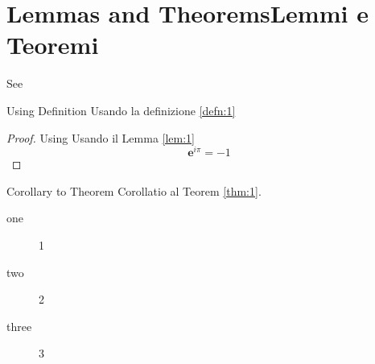 \section[L and T]{\ifCDLeng Lemmas and Theorems\fi\ifCDLita Lemmi e Teoremi\fi}

\begin{Lem}[Cauchy]\label{lem:1}
  \lipsum[3]

  See \cite{wiki:it:tautol}
\end{Lem}

\begin{Theorem}\label{thm:1}
  \CDLeng Using Definition
  \CDLita Usando la definizione
  \ref{defn:1} \\
  \lipsum[4]
  \begin{proof}
    \CDLeng Using 
    \CDLita Usando il Lemma \ref{lem:1}
    \begin{equation}
      \label{eq:1}
      {\mathbf{e}}^{i \pi }=-1
    \end{equation}
  \end{proof}
\end{Theorem}


\begin{Cor}\label{cor:1}
  \CDLeng Corollary to Theorem
  \CDLita Corollatio al Teorem
  \ref{thm:1}.
  \\
  \lipsum[6]
\end{Cor}

\begin{description}
\item[one] 1
\item[two] 2 %
\item[three] 3
\end{description}


